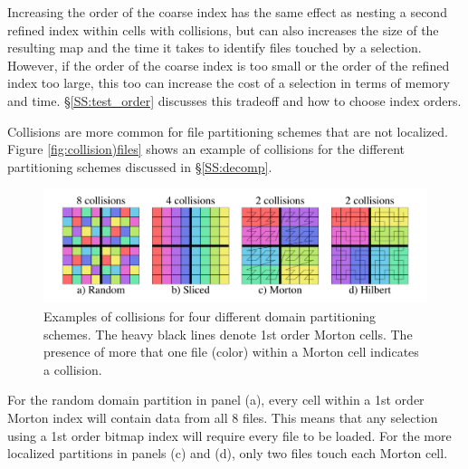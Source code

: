 \documentclass[apjl]{emulateapj}
\begin{document}
Increasing the order of the coarse index has the same effect as nesting a second refined index within cells with collisions, but can also increases the size of the resulting map and the time it takes to identify files touched by a selection. However, if the order of the coarse index is too small or the order of the refined index too large, this too can increase the cost of a selection in terms of memory and time. \S\ref{SS:test_order} discusses this tradeoff and how to choose index orders.

Collisions are more common for file partitioning schemes that are not localized. Figure \ref{fig:collision)files} shows an example of collisions for the different partitioning schemes discussed in \S\ref{SS:decomp}.
%
\begin{figure}[htbp]
\begin{center}
\includegraphics[width=\columnwidth,keepaspectratio]{../images/index.png}
\caption{Examples of collisions for four different domain partitioning schemes. The heavy black lines denote 1st order Morton cells. The presence of more that one file (color) within a Morton cell indicates a collision.}
\label{fig:collision_files}
\end{center}
\end{figure}
%
For the random domain partition in panel (a), every cell within a 1st order Morton index will contain data from all 8 files. This means that any selection using a 1st order bitmap index will require every file to be loaded. For the more localized partitions in panels (c) and (d), only two files touch each Morton cell.

\end{document}
